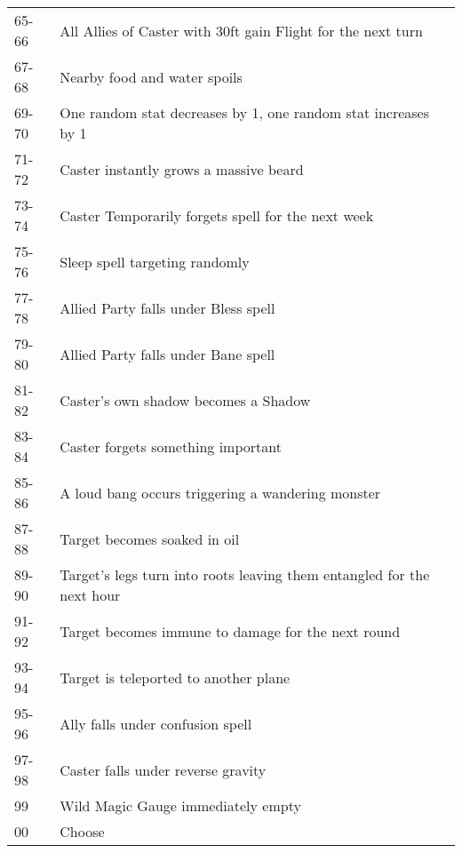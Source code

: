 \begin{table}[H]
\begin{center}
\begin{tabularx}{\textwidth}{s 
>{\arraybackslash{}\hsize}X}
65-66 & All Allies of Caster with 30ft gain Flight for the next turn \\
67-68 & Nearby food and water spoils\\
69-70 & One random stat decreases by 1, one random stat increases by 1\\
71-72 & Caster instantly grows a massive beard\\
73-74 & Caster Temporarily forgets spell for the next week\\
75-76 & Sleep spell targeting randomly\\
77-78 & Allied Party falls under Bless spell\\
79-80 & Allied Party falls under Bane spell\\
81-82 & Caster's own shadow becomes a Shadow \\
83-84 & Caster forgets something important\\
85-86 & A loud bang occurs triggering a wandering monster \\
87-88 & Target becomes soaked in oil\\
89-90 & Target's legs turn into roots leaving them entangled for the next hour\\
91-92 & Target becomes immune to damage for the next round\\
93-94 & Target is teleported to another plane\\
95-96 & Ally falls under confusion spell\\
97-98 & Caster falls under reverse gravity\\
99 & Wild Magic Gauge immediately empty \\
00 & Choose \\
\end{tabularx}
\end{center}
\label{table:WildMagic}
\end{table}


